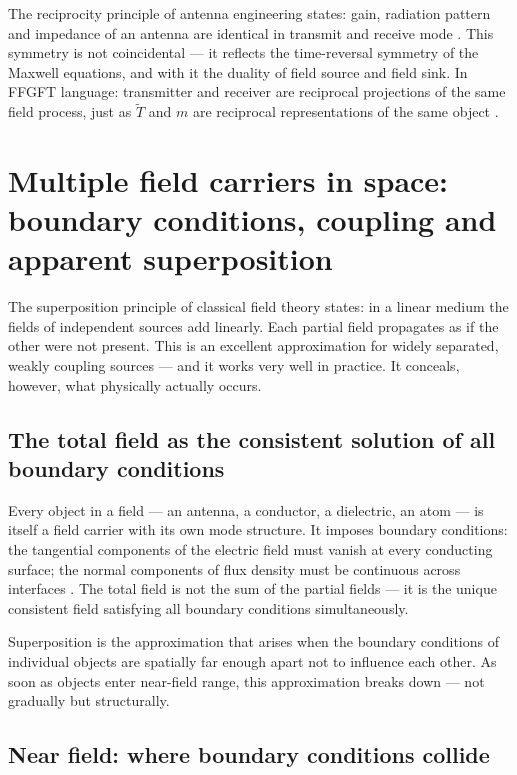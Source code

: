 The reciprocity principle of antenna engineering states: gain, radiation
pattern and impedance of an antenna are identical in transmit and receive
mode \cite{Balanis2016,Griffiths1999}. This symmetry is not coincidental ---
it reflects the time-reversal symmetry of the Maxwell equations, and with it
the duality of field source and field sink. In FFGFT language: transmitter
and receiver are reciprocal projections of the same field process, just as
$\tilde{T}$ and $m$ are reciprocal representations of the same object \SM.

\section{Multiple field carriers in space: boundary conditions, coupling and apparent superposition}

The superposition principle of classical field theory states: in a linear
medium the fields of independent sources add linearly. Each partial field
propagates as if the other were not present. This is an excellent
approximation for widely separated, weakly coupling sources --- and it
works very well in practice. It conceals, however, what physically actually
occurs.

\subsection*{The total field as the consistent solution of all boundary conditions}

Every object in a field --- an antenna, a conductor, a dielectric, an atom
--- is itself a field carrier with its own mode structure. It imposes
boundary conditions: the tangential components of the electric field must
vanish at every conducting surface; the normal components of flux density
must be continuous across interfaces \EM. The total field is not the sum of
the partial fields --- it is the unique consistent field satisfying all
boundary conditions simultaneously.

Superposition is the approximation that arises when the boundary conditions
of individual objects are spatially far enough apart not to influence each
other. As soon as objects enter near-field range, this approximation breaks
down --- not gradually but structurally.

\subsection*{Near field: where boundary conditions collide}

